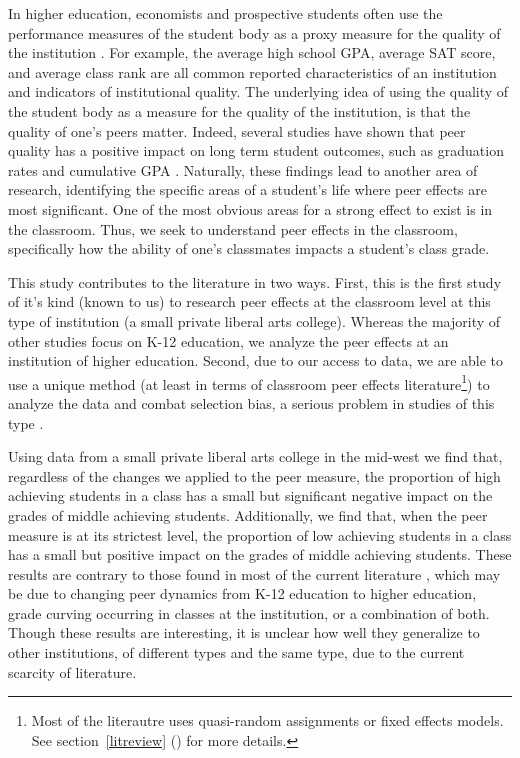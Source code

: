 \documentclass[12pt,letterpaper,english,fleqn,titlepage]{article}
\newcommand{\sectlabel}[1]{section~\ref{#1} (\nameref{#1})}
\begin{document}
In higher education, economists and prospective students often use the performance measures of the student body as a proxy measure for the quality of the institution \citep{smith2015new,sarmiento2015quality,black2006estimating}.
For example, the average high school GPA, average SAT score, and average class rank are all common reported characteristics of an institution and indicators of institutional quality.
The underlying idea of using the quality of the student body as a measure for the quality of the institution, is that the quality of one's peers matter. 
Indeed, several studies have shown that peer quality has a positive impact on long term student outcomes, such as graduation rates and cumulative GPA \citep{smith2015new,luppino2015college,ost2010role}. 
Naturally, these findings lead to another area of research, identifying the specific areas of a student's life where peer effects are most significant. 
One of the most obvious areas for a strong effect to exist is in the classroom.
Thus, we seek to understand peer effects in the classroom, specifically how the ability of one's classmates impacts a student's class grade.

This study contributes to the literature in two ways.
First, this is the first study of it's kind (known to us) to research peer effects at the classroom level at this type of institution (a small private liberal arts college).
Whereas the majority of other studies focus on K-12 education, we analyze the peer effects at an institution of higher education.
Second, due to our access to data, we are able to use a unique method (at least in terms of classroom peer effects literature\footnote{Most of the literautre uses quasi-random assignments or fixed effects models. See \sectlabel{litreview} for more details.}) to analyze the data and combat selection bias, a serious problem in studies of this type \citep{carman2012classroom,burke2013classroom,ding2007peers}. 

Using data from a small private liberal arts college in the mid-west we find that, regardless of the changes we applied to the peer measure, the proportion of high achieving students in a class has a small but significant negative impact on the grades of middle achieving students. 
Additionally, we find that, when the peer measure is at its strictest level, the proportion of low achieving students in a class has a small but positive impact on the grades of middle achieving students. 
These results are contrary to those found in most of the current literature \citep{kang2007classroom,carman2012classroom,burke2013classroom,schlosser2008inside,lavy2012good}, which may be due to changing peer dynamics from K-12 education to higher education, grade curving occurring in classes at the institution, or a combination of both.
Though these results are interesting, it is unclear how well they generalize to other institutions, of different types and the same type, due to the current scarcity of literature. 
\end{document}
